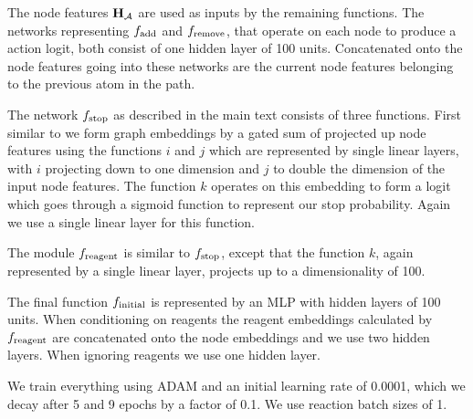 \documentclass{article}
\begin{document}
The node features ${\mathbf{H}}_{{\mathcal{A}}}$ are used as inputs by the remaining functions. 
The networks representing $f_{\textrm{add}}$ and $f_{\textrm{remove}}$, that operate on each node to produce a action logit, both consist of one hidden layer of 100 units. 
Concatenated onto the node features going into these networks are the current node features belonging to the previous atom in the path.

The network $f_{\textrm{stop}}$ as described in the main text consists of three functions. 
First similar to \citet[\S B.1]{li2018learning} we  form graph embeddings by a gated sum of projected up node features using the functions $i$ and $j$ which are represented by single linear layers, with $i$ projecting down to one dimension and $j$ to double the dimension of the input node features. 
The function $k$ operates on this embedding to form a logit which goes through a sigmoid function to represent our stop probability. Again we use a single linear layer for this function.

The module $f_{\textrm{reagent}}$ is similar to $f_{\textrm{stop}}$, except that the function $k$, again represented by a single linear layer, projects up to a dimensionality of 100.

The final function $f_{\textrm{initial}}$ is represented by an MLP with hidden layers of 100 units. When conditioning on reagents the reagent embeddings calculated by $f_{\textrm{reagent}}$ are concatenated onto the node embeddings and we use two hidden layers. When ignoring reagents we use one hidden layer.

We train everything using ADAM \citep{kingma2014adam} and an initial learning rate of 0.0001, which we decay after 5 and 9 epochs by a factor of 0.1. We use reaction batch sizes of 1.













\end{document}
